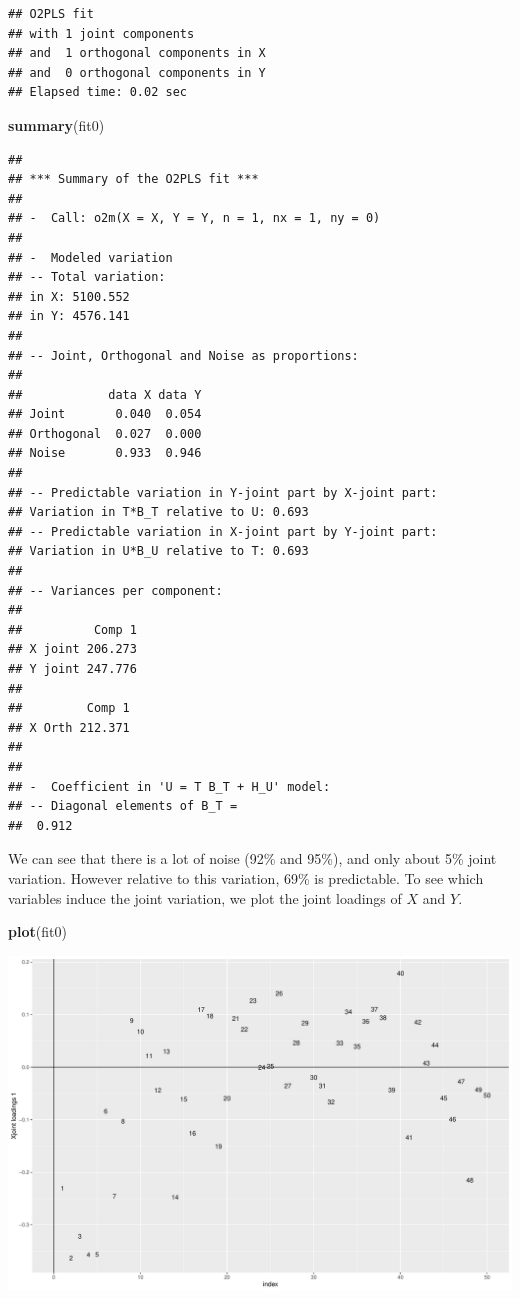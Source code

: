 \documentclass[]{article}
\newenvironment{Shaded}{\begin{snugshade}}{\end{snugshade}}
\newcommand{\KeywordTok}[1]{\textcolor[rgb]{0.13,0.29,0.53}{\textbf{#1}}}
\newcommand{\NormalTok}[1]{#1}
\begin{document}
\begin{verbatim}
## O2PLS fit 
## with 1 joint components  
## and  1 orthogonal components in X 
## and  0 orthogonal components in Y 
## Elapsed time: 0.02 sec
\end{verbatim}

\begin{Shaded}
\begin{Highlighting}[]
\KeywordTok{summary}\NormalTok{(fit0)}
\end{Highlighting}
\end{Shaded}

\begin{verbatim}
## 
## *** Summary of the O2PLS fit *** 
## 
## -  Call: o2m(X = X, Y = Y, n = 1, nx = 1, ny = 0) 
## 
## -  Modeled variation
## -- Total variation:
## in X: 5100.552 
## in Y: 4576.141 
## 
## -- Joint, Orthogonal and Noise as proportions:
## 
##            data X data Y
## Joint       0.040  0.054
## Orthogonal  0.027  0.000
## Noise       0.933  0.946
## 
## -- Predictable variation in Y-joint part by X-joint part:
## Variation in T*B_T relative to U: 0.693 
## -- Predictable variation in X-joint part by Y-joint part:
## Variation in U*B_U relative to T: 0.693 
## 
## -- Variances per component:
## 
##          Comp 1
## X joint 206.273
## Y joint 247.776
## 
##         Comp 1
## X Orth 212.371
## 
## 
## -  Coefficient in 'U = T B_T + H_U' model:
## -- Diagonal elements of B_T =
##  0.912
\end{verbatim}

We can see that there is a lot of noise (92\% and 95\%), and only about
5\% joint variation. However relative to this variation, 69\% is
predictable. To see which variables induce the joint variation, we plot
the joint loadings of \(X\) and \(Y\).

\begin{Shaded}
\begin{Highlighting}[]
\KeywordTok{plot}\NormalTok{(fit0)}
\end{Highlighting}
\end{Shaded}

\includegraphics{Figs/unnamed-chunk-5-1.pdf}
\end{document}

